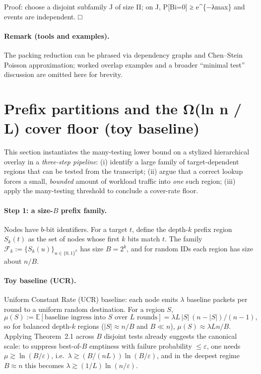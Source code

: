 \documentclass[
 11pt,
]{article}
\begin{document}
Proof: choose a disjoint subfamily J of size Π; on J, P{[}Bi=0{]} ≥
e\^{}\{−λmax\} and events are independent. □

\paragraph{Remark (tools and examples).} The packing reduction can be phrased via dependency graphs and Chen--Stein Poisson approximation; worked overlap examples and a broader ``minimal test'' discussion are omitted here for brevity.

\section{Prefix partitions and the Ω(ln n / L) cover floor (toy
baseline)}\label{prefix-partitions-and-the-ux3c9ln-n-l-cover-floor-toy-baseline}

This section instantiates the many-testing lower bound on a stylized hierarchical
overlay in a \emph{three-step pipeline}: (i) identify a large family of
target-dependent regions that can be tested from the transcript; (ii) argue that
a correct lookup forces a small, \emph{bounded} amount of workload traffic into
\emph{one} such region; (iii) apply the many-testing threshold to conclude a
cover-rate floor.

\paragraph{Step 1: a size-$B$ prefix family.}
Nodes have $b$-bit identifiers. For a target $t$, define the depth-$k$ prefix
region $S_k(t)$ as the set of nodes whose first $k$ bits match $t$. The family
$\mathcal{F}_k := \{S_k(u)\}_{u\in\{0,1\}^k}$ has size $B=2^k$, and for random IDs
each region has size about $n/B$.

\paragraph{Toy baseline (UCR).}
Uniform Constant Rate (UCR) baseline: each node emits $\lambda$ baseline packets
per round to a uniform random destination. For a region $S$,
\[
\mu(S) := \mathbb{E}[\text{baseline ingress into }S\text{ over }L\text{ rounds}]
= \lambda L\,|S|\,(n-|S|)/(n-1),
\]
so for balanced depth-$k$ regions ($|S|\approx n/B$ and $B\ll n$),
$\mu(S)\approx \lambda L n/B$. Applying Theorem~2.1 across $B$ disjoint tests
already suggests the canonical scale: to suppress best-of-$B$ emptiness with
failure probability $\le \varepsilon$, one needs $\mu \gtrsim \ln(B/\varepsilon)$,
i.e.\ $\lambda \gtrsim (B/(nL))\ln(B/\varepsilon)$, and in the deepest regime
$B\approx n$ this becomes $\lambda \gtrsim (1/L)\ln(n/\varepsilon)$.
\end{document}
